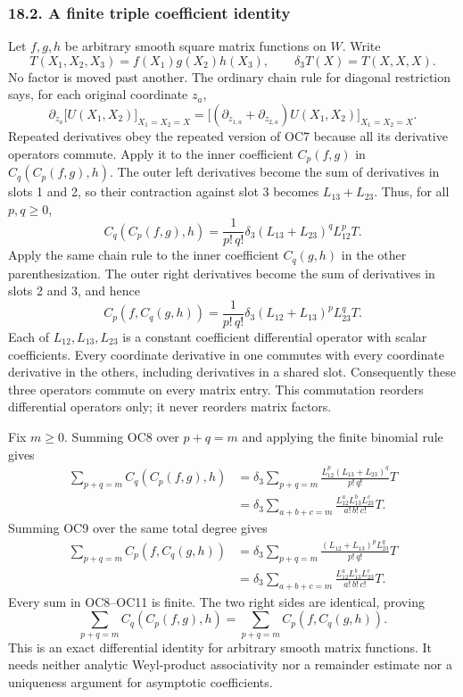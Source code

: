 \documentclass[
  11pt,
]{article}
\begin{document}
\subsubsection{18.2. A finite triple coefficient
identity}\label{a-finite-triple-coefficient-identity}

Let \(f,g,h\) be arbitrary smooth square matrix functions on \(W\).
Write \[
T(X_1,X_2,X_3)=f(X_1)g(X_2)h(X_3),
\qquad
\delta_3T(X)=T(X,X,X).
\tag{OC6}
\] No factor is moved past another. The ordinary chain rule for diagonal
restriction says, for each original coordinate \(z_a\), \[
\partial_{z_a}\bigl[U(X_1,X_2)\bigr]_{X_1=X_2=X}
=\bigl[(\partial_{z_{1,a}}+\partial_{z_{2,a}})
          U(X_1,X_2)\bigr]_{X_1=X_2=X}.
\tag{OC7}
\] Repeated derivatives obey the repeated version of OC7 because all its
derivative operators commute. Apply it to the inner coefficient
\(C_p(f,g)\) in \(C_q(C_p(f,g),h)\). The outer left derivatives become
the sum of derivatives in slots 1 and 2, so their contraction against
slot 3 becomes \(L_{13}+L_{23}\). Thus, for all \(p,q\ge0\), \[
C_q(C_p(f,g),h)
=\frac1{p!\,q!}\delta_3
 (L_{13}+L_{23})^qL_{12}^pT.
\tag{OC8}
\] Apply the same chain rule to the inner coefficient \(C_q(g,h)\) in
the other parenthesization. The outer right derivatives become the sum
of derivatives in slots 2 and 3, and hence \[
C_p(f,C_q(g,h))
=\frac1{p!\,q!}\delta_3
 (L_{12}+L_{13})^pL_{23}^qT.
\tag{OC9}
\] Each of \(L_{12},L_{13},L_{23}\) is a constant coefficient
differential operator with scalar coefficients. Every coordinate
derivative in one commutes with every coordinate derivative in the
others, including derivatives in a shared slot. Consequently these three
operators commute on every matrix entry. This commutation reorders
differential operators only; it never reorders matrix factors.

Fix \(m\ge0\). Summing OC8 over \(p+q=m\) and applying the finite
binomial rule gives \[
\begin{aligned}
\sum_{p+q=m}C_q(C_p(f,g),h)
&=\delta_3
 \sum_{p+q=m}\frac{L_{12}^p(L_{13}+L_{23})^q}{p!\,q!}T\\
&=\delta_3
 \sum_{a+b+c=m}\frac{L_{12}^aL_{13}^bL_{23}^c}{a!\,b!\,c!}T.
\end{aligned}
\tag{OC10}
\] Summing OC9 over the same total degree gives \[
\begin{aligned}
\sum_{p+q=m}C_p(f,C_q(g,h))
&=\delta_3
 \sum_{p+q=m}\frac{(L_{12}+L_{13})^pL_{23}^q}{p!\,q!}T\\
&=\delta_3
 \sum_{a+b+c=m}\frac{L_{12}^aL_{13}^bL_{23}^c}{a!\,b!\,c!}T.
\end{aligned}
\tag{OC11}
\] Every sum in OC8--OC11 is finite. The two right sides are identical,
proving \[
\boxed{\sum_{p+q=m}C_q(C_p(f,g),h)
       =\sum_{p+q=m}C_p(f,C_q(g,h)).}
\tag{OC12}
\] This is an exact differential identity for arbitrary smooth matrix
functions. It needs neither analytic Weyl-product associativity nor a
remainder estimate nor a uniqueness argument for asymptotic
coefficients.
\end{document}
